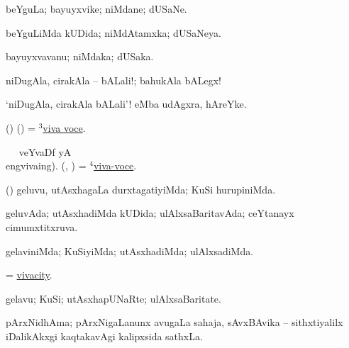 \bentry 
{} 
\gl{\nA}
\expl{}
\bmng
 beYguLa; bayuyxvike; niMdane; dUSaNe. 
\emng
\eentry

\bentry 
{} 
\gl{\gu}
\expl{}
\bmng
 beYguLiMda kUDida; niMdAtamxka; dUSaNeya. 
\emng
\eentry

\bentry 
{} 
\gl{\nA}
\expl{}
\bmng
 bayuyxvavanu; niMdaka; dUSaka. 
\emng
\eentry

\bentry
{} 
\gl{\BAavayx}
\expl{\It\ }
\bmng
niDugAla, cirakAla -- bALali!; bahukAla bALegx! 
\emng
\eentry

\bentry 
{} 
\gl{\nA}
\expl{\It}
\bmng
 `niDugAla, cirakAla bALali'! eMba udAgxra, hAreYke. 
\emng
\eentry

\bentry 
{} 
\gl{\nA}
\expl{}
\bmng
 (\birx) (\AmA) = \hyperlink{viva voce(3)}{$^3$viva voce}. 
\emng
\eentry

\bentry
{} 
\gl{\sakirx}
\BUkaq\  \ucAcx\ veYvaDf yA  \vakaq\\eng{vivaing}). \bmng
(\birx, \AmA) = \hyperlink{viva-voce(1)}{$^4$viva-voce}. 
\emng
\eentry

\bentry 
{} 
\gl{\kirxvi}
\expl{}
\bmng
 (\saM) geluvu, utAsxhagaLa durxtagatiyiMda; KuSi hurupiniMda. 
\emng
\eentry

\bentry 
{} 
\gl{\gu}
\expl{}
\bmng
 geluvAda; utAsxhadiMda kUDida; ulAlxsaBaritavAda; ceYtanayx cimumxtitxruva. 
\emng
\eentry

\bentry 
{} 
\gl{\kirxvi}
\expl{}
\bmng
 gelaviniMda; KuSiyiMda; utAsxhadiMda; ulAlxsadiMda. 
\emng
\eentry

\bentry
{} 
\gl{\nA}
\expl{}
\bmng
 = \hyperlink{vivacity}{vivacity}. 
\emng
\eentry

\bentry
{} 
\gl{\nA}
\expl{}
\bmng
 gelavu; KuSi; utAsxhapUNaRte; ulAlxsaBaritate. 
\emng
\eentry

\bentry 
{} 
\gl{\nA}
\bmng
 pArxNidhAma; pArxNigaLanunx avugaLa sahaja, sAvxBAvika -- sithxtiyalilx iDalikAkxgi kaqtakavAgi kalipxsida sathxLa. 
\emng
\eentry

